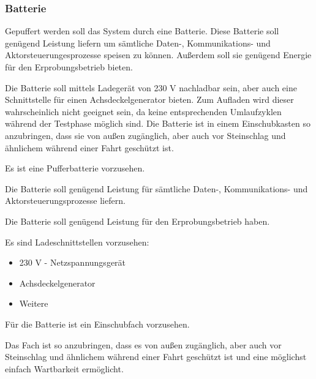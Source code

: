 \subsubsection{Batterie}
Gepuffert werden soll das System durch eine Batterie. Diese Batterie soll genügend Leistung liefern um sämtliche Daten-, Kommunikations- und Aktorsteuerungesprozesse speisen zu können. Außerdem soll sie genügend Energie für den Erprobungsbetrieb bieten.\par
Die Batterie soll mittels Ladegerät von 230 V nachladbar sein, aber auch eine Schnittstelle für einen Achsdeckelgenerator bieten. Zum Aufladen wird dieser wahrscheinlich nicht geeignet sein, da keine entsprechenden Umlaufzyklen während der Testphase möglich sind. %
Die Batterie ist in einem Einschubkasten so anzubringen, dass sie von außen zugänglich, aber auch vor Steinschlag und ähnlichem während einer Fahrt geschützt ist.\par
\begin{feat}
Es ist eine Pufferbatterie vorzusehen.
\end{feat}
\begin{rem}[zu Anf. 11]
Die Batterie soll genügend Leistung für sämtliche Daten-, Kommunikations- und Aktorsteuerungsprozesse liefern.
\end{rem}
\begin{rem}[zu Anf. 11]
Die Batterie soll genügend Leistung für den Erprobungsbetrieb haben.
\end{rem}
\begin{rem}[zu Anf. 11]
Es sind Ladeschnittstellen vorzusehen:
\begin{itemize}
    \item 230 V - Netzspannungsgerät
    \item Achsdeckelgenerator
    \item Weitere
\end{itemize}
\end{rem}
\begin{feat}
Für die Batterie ist ein Einschubfach vorzusehen. 
\end{feat}
\begin{rem} [zu Anf. 12]
Das Fach ist so anzubringen, dass es von außen zugänglich, aber auch vor Steinschlag und ähnlichem während einer Fahrt geschützt ist und eine möglichst einfach Wartbarkeit ermöglicht.
\end{rem}
